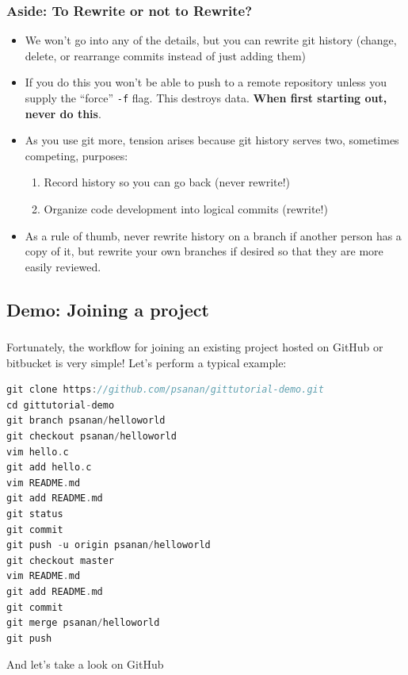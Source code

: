 \documentclass{beamer}
\begin{document}
\begin{frame}[fragile]
\frametitle{Aside: To Rewrite or not to Rewrite?}
\begin{itemize}
\item
We won't go into any of the details, but you can rewrite git history (change, delete, or rearrange commits instead of just adding them)
\item If you do this you won't be able to push to a remote repository unless you supply the ``force'' \lstinline{-f} flag. This destroys data. \textbf{When first starting out, never do this}.
\item As you use git more, tension arises because git history serves two, sometimes competing, purposes:
\begin{enumerate}
\item Record history so you can go back (never rewrite!)
\item Organize code development into logical commits (rewrite!)
\end{enumerate}
\item As a rule of thumb, never rewrite history on a branch if another person has a copy of it, but rewrite your own branches if desired so that they are more easily reviewed.
\end{itemize}
\end{frame}

\subsection{Demo: Joining a project}

\begin{frame}[fragile]
\frametitle{}
Fortunately, the workflow for joining an existing project hosted on GitHub or bitbucket is very simple!
Let's perform a typical example:
\begin{lstlisting}[language=C++]
git clone https://github.com/psanan/gittutorial-demo.git
cd gittutorial-demo
git branch psanan/helloworld
git checkout psanan/helloworld
vim hello.c
git add hello.c
vim README.md
git add README.md
git status
git commit
git push -u origin psanan/helloworld
git checkout master
vim README.md
git add README.md
git commit
git merge psanan/helloworld
git push
\end{lstlisting}
And let's take a look on GitHub
\end{frame}
\end{document}

